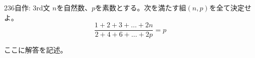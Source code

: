 \begin{thm}{236}{}{自作: 3rd文}
 $n$を自然数、$p$を素数とする。次を満たす組$(n,p)$を全て決定せよ。\\
 \[ \frac{1+2+3+\dots+2n}{2+4+6+\dots+2p}=p \]
\end{thm}

ここに解答を記述。